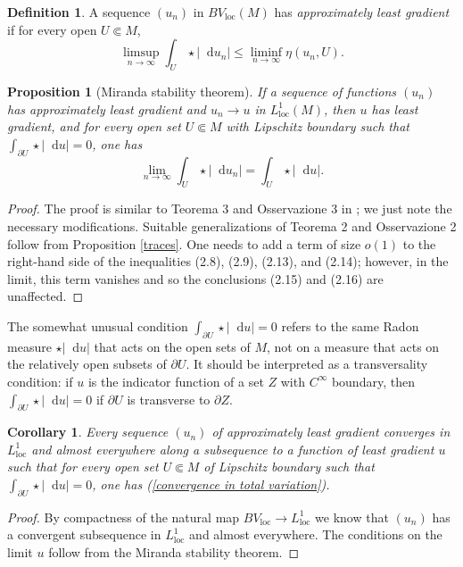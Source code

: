\documentclass[reqno,12pt,letterpaper]{amsart}
\newcommand*\dif{\mathop{}\!\mathrm{d}}
\newcommand{\dfn}[1]{\emph{#1}\index{#1}}
\newcommand{\loc}{\mathrm{loc}}
\newtheorem{proposition}[theorem]{Proposition}
\newtheorem{corollary}[theorem]{Corollary}
\theoremstyle{definition}
\newtheorem{definition}[theorem]{Definition}
\numberwithin{equation}{section}
\begin{document}
\begin{definition}
A sequence $(u_n)$ in $BV_\loc(M)$ has \dfn{approximately least gradient} if for every open $U \Subset M$,
$$\limsup_{n \to \infty} \int_U \star |\dif u_n| \leq \liminf_{n \to \infty} \eta(u_n, U).$$
\end{definition}

\begin{proposition}[Miranda stability theorem]\label{Miranda convergence}
If a sequence of functions $(u_n)$ has approximately least gradient and $u_n \to u$ in $L^1_\loc(M)$, then $u$ has least gradient, and for every open set $U \Subset M$ with Lipschitz boundary such that $\int_{\partial U} \star |\dif u| = 0$, one has
\begin{equation}\label{convergence in total variation}
\lim_{n \to \infty} \int_U \star |\dif u_n| = \int_U \star |\dif u|.
\end{equation}
\end{proposition}
\begin{proof}
The proof is similar to Teorema 3 and Osservazione 3 in \cite{Miranda67}; we just note the necessary modifications.
Suitable generalizations of Teorema 2 and Osservazione 2 follow from Proposition \ref{traces}.
One needs to add a term of size $o(1)$ to the right-hand side of the inequalities (2.8), (2.9), (2.13), and (2.14); however, in the limit, this term vanishes and so the conclusions (2.15) and (2.16) are unaffected.
\end{proof}

The somewhat unusual condition $\int_{\partial U} \star |\dif u| = 0$ refers to the same Radon measure $\star |\dif u|$ that acts on the open sets of $M$, not on a measure that acts on the relatively open subsets of $\partial U$.
It should be interpreted as a transversality condition: if $u$ is the indicator function of a set $Z$ with $C^\infty$ boundary, then $\int_{\partial U} \star |\dif u| = 0$ if $\partial U$ is transverse to $\partial Z$.

\begin{corollary}\label{compactness}
Every sequence $(u_n)$ of approximately least gradient converges in $L^1_\loc$ and almost everywhere along a subsequence to a function of least gradient $u$ such that for every open set $U \Subset M$ of Lipschitz boundary such that $\int_{\partial U} \star |\dif u| = 0$, one has (\ref{convergence in total variation}).
\end{corollary}
\begin{proof}
By compactness of the natural map $BV_\loc \to L^1_\loc$ we know that $(u_n)$ has a convergent subsequence in $L^1_\loc$ and almost everywhere.
The conditions on the limit $u$ follow from the Miranda stability theorem.
\end{proof}
\end{document}
